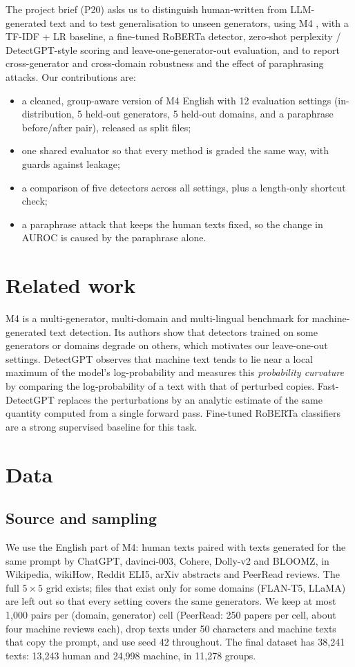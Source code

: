 \documentclass[11pt,a4paper]{article}
\begin{document}
The project brief (P20) asks us to distinguish human-written from LLM-generated text and to test generalisation to
unseen generators, using M4 \citep{wang24}, with a TF-IDF + LR baseline, a fine-tuned RoBERTa detector, zero-shot
perplexity / DetectGPT-style scoring and leave-one-generator-out evaluation, and to report cross-generator and
cross-domain robustness and the effect of paraphrasing attacks. Our contributions are:
\begin{itemize}
  \item a cleaned, group-aware version of M4 English with 12 evaluation settings (in-distribution, 5 held-out
        generators, 5 held-out domains, and a paraphrase before/after pair), released as split files;
  \item one shared evaluator so that every method is graded the same way, with guards against leakage;
  \item a comparison of five detectors across all settings, plus a length-only shortcut check;
  \item a paraphrase attack that keeps the human texts fixed, so the change in AUROC is caused by the paraphrase alone.
\end{itemize}

\section{Related work}

M4 \citep{wang24} is a multi-generator, multi-domain and multi-lingual benchmark for machine-generated text detection.
Its authors show that detectors trained on some generators or domains degrade on others, which motivates our
leave-one-out settings. DetectGPT \citep{mitchell23} observes that machine text tends to lie near a local maximum of
the model's log-probability and measures this \emph{probability curvature} by comparing the log-probability of a text
with that of perturbed copies. Fast-DetectGPT \citep{bao24} replaces the perturbations by an analytic estimate of the
same quantity computed from a single forward pass. Fine-tuned RoBERTa classifiers \citep{liu19} are a strong
supervised baseline for this task.

\section{Data}

\subsection{Source and sampling}
We use the English part of M4: human texts paired with texts generated for the same prompt by ChatGPT, davinci-003,
Cohere, Dolly-v2 and BLOOMZ, in Wikipedia, wikiHow, Reddit ELI5, arXiv abstracts and PeerRead reviews. The full
$5 \times 5$ grid exists; files that exist only for some domains (FLAN-T5, LLaMA) are left out so that every setting
covers the same generators. We keep at most 1,000 pairs per (domain, generator) cell (PeerRead: 250 papers per cell,
about four machine reviews each), drop texts under 50 characters and machine texts that copy the prompt, and use seed
42 throughout. The final dataset has 38,241 texts: 13,243 human and 24,998 machine, in 11,278 groups.
\end{document}
